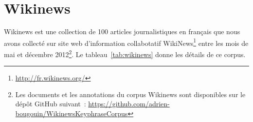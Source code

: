   \section{Wikinews}
  \label{sec:main-data_description-wikinews_data}
    Wikinews est une collection de 100 articles journalistiques en français
    que nous avons collecté sur site web d'information collabotatif
    WikiNews\footnote{\url{http://fr.wikinews.org/}} entre les mois de mai et
    décembre 2012\footnote{Les documents et les annotations du corpus Wikinews
    sont disponibles sur le dépôt GitHub suivant~:
    \url{https://github.com/adrien-bougouin/WikinewsKeyphraseCorpus}}. Le
    tableau~\ref{tab:wikinews} donne les détails de ce corpus. 

    \begin{table}[!h]
      \centering

      \caption{Corpus Wikinews
               \label{tab:wikinews}}
    \end{table}



